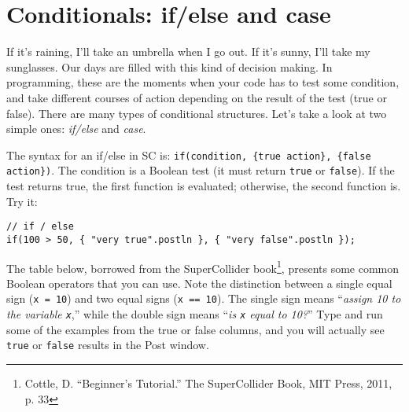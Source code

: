 \section{Conditionals: if/else and case}

If it's raining, I'll take an umbrella when I go out. If it's sunny, I'll take my sunglasses. Our days are filled with this kind of decision making. In programming, these are the moments when your code has to test some condition, and take different courses of action depending on the result of the test (true or false). There are many types of conditional structures. Let's take a look at two simple ones: \emph{if/else} and \emph{case}.

The syntax for an if/else in SC is: \texttt{if(condition, \{true action\}, \{false action\})}. The condition is a Boolean test (it must return \texttt{true} or \texttt{false}). If the test returns true, the first function is evaluated; otherwise, the second function is. Try it:

\begin{lstlisting}[style=SuperCollider-IDE, basicstyle=\scttfamily\footnotesize]
// if / else
if(100 > 50, { "very true".postln }, { "very false".postln });
\end{lstlisting}

The table below, borrowed from the SuperCollider book\footnote{Cottle, D. ``Beginner's Tutorial.'' The SuperCollider Book, MIT Press, 2011, p. 33}, presents some common Boolean operators that you can use. Note the distinction between a single equal sign (\texttt{x = 10}) and two equal signs (\texttt{x == 10}). The single sign means ``\textit{assign 10 to the variable \texttt{x}},'' while the double sign means ``\textit{is \texttt{x} equal to 10?}'' Type and run some of the examples from the true or false columns, and you will actually see \texttt{true} or \texttt{false} results in the Post window.
 
